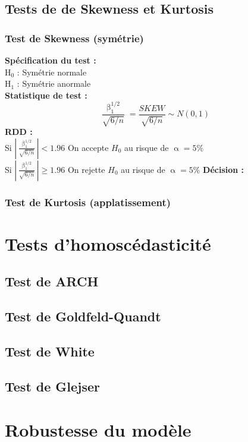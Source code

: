 \documentclass[A4paper]{article}
\begin{document}
\subsection{Tests de de Skewness et Kurtosis}
\subsubsection{Test de Skewness (symétrie)}
\textbf{Spécification du test :} \\
H$_0$ : Symétrie normale \\
H$_1$ : Symétrie anormale \\
\textbf{Statistique de test :}
\begin{equation*}
		\frac{\upbeta_1^{1/2}}{\sqrt{6/n}}=  \frac{SKEW}{\sqrt{6/n}} \sim N(0,1)
\end{equation*}
\textbf{RDD :} \\
Si $\left| \frac{\upbeta^{1/2}_1}{\sqrt{6/n}} \right|  < 1.96$ On accepte $H_0$ au risque de $\upalpha = 5\% $\\
Si $\left| \frac{\upbeta^{1/2}_1}{\sqrt{6/n}} \right|  \geq 1.96$ On rejette $H_0$ au risque de $\upalpha = 5\%$ 
\textbf{Décision :}


\subsubsection{Test de Kurtosis (applatissement)}

\section{Tests d'homoscédasticité}
\subsection{Test de ARCH}
\subsection{Test de Goldfeld-Quandt}
\subsection{Test de White}
\subsection{Test de Glejser}

\section{Robustesse du modèle}
\end{document}
